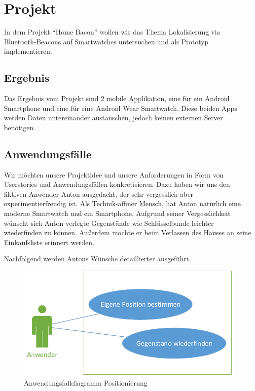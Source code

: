 



\setcounter{secnumdepth}{3}
\setcounter{tocdepth}{2}

\pagestyle{empty}


\tableofcontents
\setcounter{page}{1}

\pagestyle{scrheadings}

\newpage

\section{Projekt}

In dem Projekt "`Home Bacon"' wollen wir das Thema Lokalisierung via
Bluetooth-Beacons auf Smartwatches untersuchen und als Prototyp implementieren.

\subsection{Ergebnis}
Das Ergebnis vom Projekt sind 2 mobile Applikation, eine für ein Android Smartphone und eine für eine Android Wear Smartwatch. Diese beiden Apps werden Daten untereinander austauschen, jedoch keinen externen Server benötigen.

\subsection{Anwendungsfälle}
Wir möchten unsere Projektidee und unsere Anforderungen in Form von Userstories und Anwendungsfällen konkretisieren. Dazu haben wir uns den fiktiven Anwender Anton ausgedacht, der sehr vergesslich aber experimentierfreudig ist. Als Technik-affiner Mensch, hat Anton natürlich eine moderne Smartwatch und ein Smartphone. Aufgrund seiner Vergesslichkeit wünscht sich Anton verlegte Gegenstände wie Schlüsselbunde leichter wiederfinden zu können. Außerdem möchte er beim Verlassen des Hauses an seine Einkaufsliste erinnert werden.

Nachfolgend werden Antons Wünsche detaillierter ausgeführt.

\begin{figure}[H]
\centering
\includegraphics[width=0.7\linewidth]{Bilder/UseCase-Position}
\caption{Anwendungsfalldiagramm Positionierung}
\label{fig:UseCase-Position}
\end{figure}

